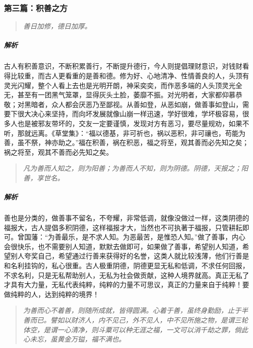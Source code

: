 \subsubsection{第三篇：积善之方}

\begin{quote}\it
    善日加修，德日加厚。
\end{quote}

\subparagraph{解析} 古人有积善意识，不断积累善行，不断提升德行，今人则提倡理财意识，对钱财看得比较重，而古人更看重的是善和德。修为好、心地清净、性情善良的人，头顶有灵光闪耀，整个人看上去也是光明开朗，神采奕奕，而作恶多端的人头顶灵光全无，甚至有一团黑气笼罩，显得灰头土脸，萎靡不振。对光明者，大家都仰慕恭敬；对黑暗者，众人都会厌恶乃至鄙视。从善如登，从恶如崩，做善事如登山，需要下很大决心来坚持，而向坏发展就像山崩一样迅速，学好很难，学坏极容易，很多人也是被邪友带坏的，交友一定要谨慎，发现对方有恶习，要尽量规劝，如果不听，那就远离。《草堂集》：“福以德基，非可祈也，祸以恶积，非可禳也，苟能为善，虽不祭，神亦助之。”福在积善，祸在积恶，福之将至，观其善而必先知之矣；祸之将至，观其不善而必先知之矣。

\begin{quote}\it
    凡为善而人知之，则为阳善；为善而人不知，则为阴德。阴德，天报之；阳善，享世名。
\end{quote}

\subparagraph{解析} 善也是分类的，做善事不留名，不夸耀，非常低调，就像没做过一样，这类阴德的福报大，古人提倡多积阴德，这样福报才大，当然也不可执著于福报，只管耕耘即可。曾国藩：“为善最乐，是不求人知。为恶最苦，是惟恐人知。”做了善事，内心会很快乐，也不需要别人知道，默默去做即可，如果做了善事，希望别人知道，希望别人夸奖自己，希望通过行善来获得好的名誉，这类人就比较浅薄，他们行善是和名利挂钩的，私心很重。古人极重阴德，阴德更显无私和低调，不求任何回报，不求名利，只是无私帮助别人，无私为社会做贡献，这种人境界就高。真正无私了才具有大力量，无私代表纯粹，纯粹的力量不可思议，真正的力量来自于纯粹！要做纯粹的人，达到纯粹的境界！

\begin{quote}\it
    为善而心不着善，则随所成就，皆得圆满。心着于善，虽终身勤励，止于半善而已。譬如以财济人，内不见己，外不见人，中不见所施之物，是谓三轮体空，是谓一心清净，则斗粟可以种无涯之福，一文可以消千劫之罪，倘此心未忘，虽黄金万镒，福不满也。
\end{quote}

